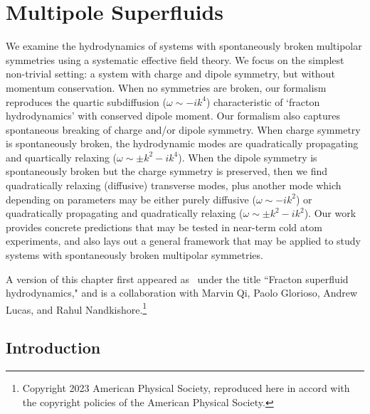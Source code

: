 
\chapter{Multipole Superfluids}\label{chp:superfluids}

We examine the hydrodynamics of systems with spontaneously broken multipolar symmetries using a systematic effective field theory. We focus on the simplest non-trivial setting: a system with charge and dipole symmetry, but without momentum conservation. When no symmetries are broken, our formalism reproduces the quartic subdiffusion ($\omega \sim -i k^4$) characteristic of `fracton hydrodynamics' with conserved dipole moment. Our formalism also captures spontaneous breaking of charge and/or dipole symmetry. When charge symmetry is spontaneously broken, the hydrodynamic modes are quadratically propagating and quartically relaxing ($\omega \sim \pm k^2 - ik^4$). When the dipole symmetry is spontaneously broken but the charge symmetry is preserved, then we find quadratically relaxing (diffusive) transverse modes, plus another mode which depending on parameters may be either purely diffusive ($\omega \sim -i k^2$) or quadratically propagating and quadratically relaxing ($\omega \sim \pm k^2 -i k^2$). Our work provides concrete predictions that may be tested in near-term cold atom experiments, and also lays out a general framework that may be applied to study systems with spontaneously broken multipolar symmetries. 

A version of this chapter first appeared as~\cite{Stahl2023Fracton} under the title ``Fracton superfluid hydrodynamics," and is a collaboration with Marvin Qi, Paolo Glorioso, Andrew Lucas, and Rahul Nandkishore.\footnote{Copyright 2023 American Physical Society, reproduced here in accord with the copyright policies of the American Physical Society.}



\section{Introduction}

